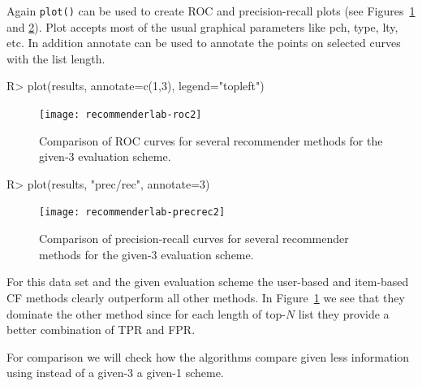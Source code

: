 \documentclass[nojss]{jss}
\newcommand{\func}[1]{\mbox{\texttt{#1()}}}
\begin{document}
Again \func{plot} can be used to create ROC and precision-recall plots
(see Figures~\ref{fig:roc2} and \ref{fig:precrec2}). Plot accepts most
of the usual graphical parameters like pch, type, lty, etc. In addition
annotate can be used to annotate the points on selected curves with the
list length.

\begin{Schunk}
\begin{Sinput}
R> plot(results, annotate=c(1,3), legend="topleft")
\end{Sinput}
\end{Schunk}
\begin{figure}
\centerline{\texttt{[image: recommenderlab-roc2]}}
\caption{Comparison of ROC curves for several recommender methods for the
given-3 evaluation scheme.}
\label{fig:roc2}
\end{figure}

\begin{Schunk}
\begin{Sinput}
R> plot(results, "prec/rec", annotate=3)
\end{Sinput}
\end{Schunk}
\begin{figure}
\centerline{\texttt{[image: recommenderlab-precrec2]}}
\caption{Comparison of precision-recall curves
for several recommender methods for the
    given-3 evaluation scheme.}
\label{fig:precrec2}
\end{figure}

For this data set and the given evaluation scheme the
user-based and item-based
CF methods clearly
outperform all other methods. In Figure~\ref{fig:roc2} we see that they
dominate the other method since for each length of top-$N$ list they
provide a better combination of TPR and FPR.

For comparison we will check how the algorithms compare given less information
using instead of a given-3 a given-1 scheme.
\end{document}
